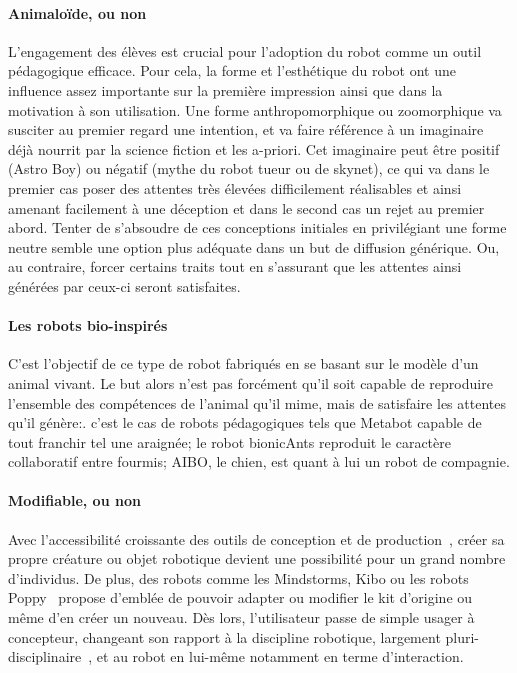            \paragraph{Animaloïde, ou non}
                L'engagement des élèves est crucial pour l'adoption du robot comme un outil pédagogique efficace. Pour cela, la forme et l'esthétique du robot ont une influence assez importante sur la première impression ainsi que dans la motivation à son utilisation.
                Une forme anthropomorphique ou zoomorphique va susciter au premier regard une intention, et va faire référence à un imaginaire déjà  nourrit par la science fiction et les a-priori. Cet imaginaire peut être positif (\eg Astro Boy) ou négatif (\eg mythe du robot tueur ou de skynet), ce qui va dans le premier cas poser des attentes très élevées difficilement réalisables et ainsi amenant facilement à une déception et dans le second cas un rejet au premier abord. Tenter de s'absoudre de ces conceptions initiales en privilégiant une forme neutre semble une option plus adéquate dans un but de diffusion générique. Ou, au contraire, forcer certains traits tout en s'assurant que les attentes ainsi générées par ceux-ci seront satisfaites.
            \paragraph{Les robots bio-inspirés}
                C'est l'objectif de ce type de robot fabriqués en se basant sur le modèle d'un animal vivant. Le but alors n'est pas forcément qu'il soit capable de reproduire l'ensemble des compétences de l'animal qu'il mime, mais de satisfaire les attentes qu'il génère:. c'est le cas de robots pédagogiques tels que Metabot capable de tout franchir tel une araignée; le robot bionicAnts reproduit le caractère collaboratif entre fourmis; AIBO, le chien, est quant à lui un robot de compagnie.
            \paragraph{Modifiable, ou non}
                Avec l'accessibilité croissante des outils de conception et de production~, créer sa propre créature ou objet robotique devient une possibilité pour un grand nombre d'individus. De plus, des robots comme les Mindstorms, Kibo ou les robots Poppy~ propose d'emblée de pouvoir adapter ou modifier le kit d'origine ou même d'en créer un nouveau. Dès lors, l'utilisateur passe de simple usager à concepteur, changeant son rapport à la discipline robotique, largement pluri-disciplinaire~, et au robot en lui-même notamment en terme d'interaction. 
